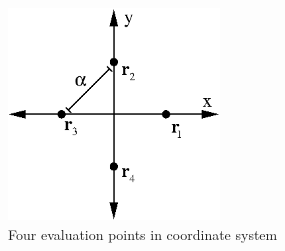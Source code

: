 \documentclass{report}
\begin{document}
\begin{figure}
  \begin{center}
    \includegraphics[width=0.5\textwidth]{figs/interpolation/four_points_on_axes.eps}
    \caption{Four evaluation points in coordinate system}
    \label{fig:four_points}
  \end{center}
\end{figure}
\end{document}
